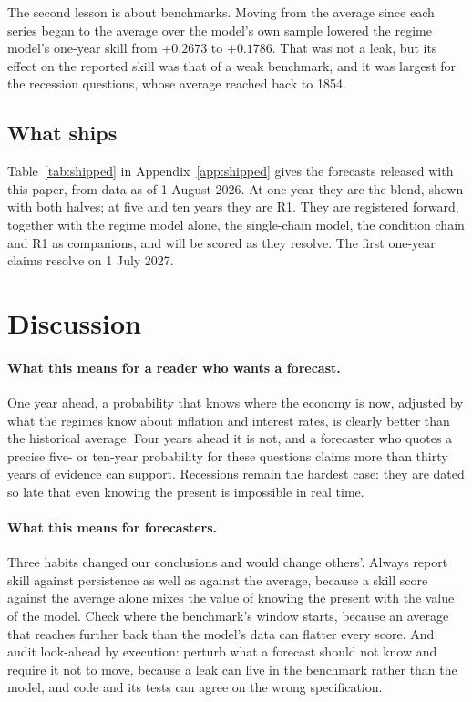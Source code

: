 \documentclass[11pt]{article}
\begin{document}
The second lesson is about benchmarks. Moving from the average since each series began to the average
over the model's own sample lowered the regime model's one-year skill from $+0.2673$ to $+0.1786$. That
was not a leak, but its effect on the reported skill was that of a weak benchmark, and it was largest
for the recession questions, whose average reached back to 1854.

\subsection{What ships}

Table~\ref{tab:shipped} in Appendix~\ref{app:shipped} gives the forecasts released with this paper,
from data as of 1 August 2026. At
one year they are the blend, shown with both halves; at five and ten years they are R1. They are
registered forward, together with the regime model alone, the single-chain model, the condition chain
and R1 as companions, and will be scored as they resolve. The first one-year claims resolve on 1 July
2027.


\section{Discussion}\label{sec:discussion}

\paragraph{What this means for a reader who wants a forecast.} One year ahead, a probability that knows
where the economy is now, adjusted by what the regimes know about inflation and interest rates, is
clearly better than the historical average. Four years ahead it is not, and a forecaster who quotes a
precise five- or ten-year probability for these questions claims more than thirty years of evidence can
support. Recessions remain the hardest case: they are dated so late that even knowing the present is
impossible in real time.

\paragraph{What this means for forecasters.} Three habits changed our conclusions and would change
others'. Always report skill against persistence as well as against the average, because a skill score
against the average alone mixes the value of knowing the present with the value of the model. Check where
the benchmark's window starts, because an average that reaches further back than the model's data can
flatter every score. And audit look-ahead by execution: perturb what a forecast should not know and
require it not to move, because a leak can live in the benchmark rather than the model, and code and its
tests can agree on the wrong specification.
\end{document}
